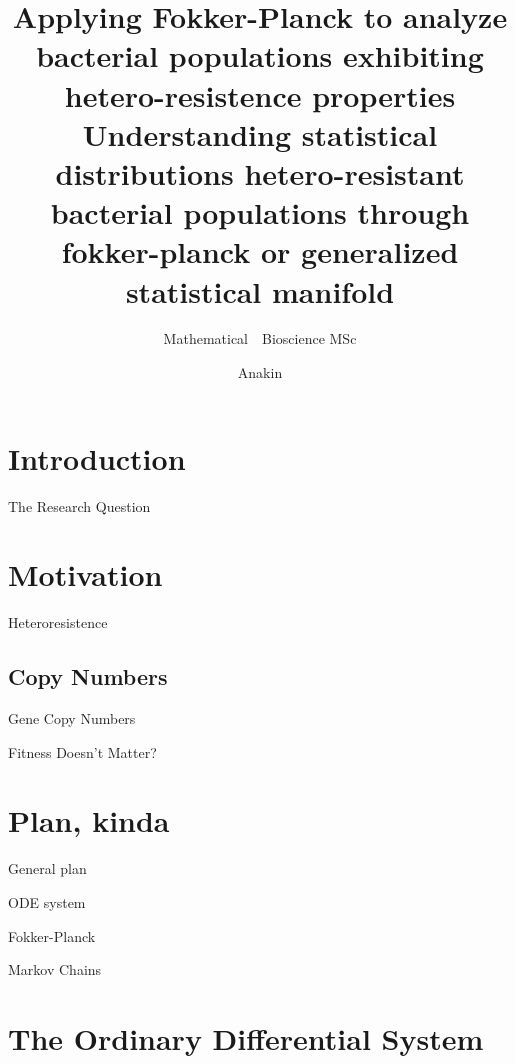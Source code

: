 \documentclass[aspectratio=169]{RUCPresentation}
\title{%
    Applying Fokker-Planck to analyze bacterial populations exhibiting hetero-resistence properties%
}
\title{%
    Understanding statistical distributions hetero-resistant bacterial populations through%
    fokker-planck or generalized statistical manifold%
}
\subtitle{  Mathematical\ \ Bioscience MSc }
\author{Anakin}
\newcommand\makebeamertitle{\frame{\maketitle}}%
\begin{document}
\makebeamertitle


\section{Introduction}

\begin{frame}{The Research Question}
\end{frame}

\section{Motivation}


\begin{frame}{Heteroresistence}
\end{frame}

\subsection{Copy Numbers}

\begin{frame}{Gene Copy Numbers}
\end{frame}


\begin{frame}{Fitness Doesn't Matter?}
\end{frame}



\section{Plan, kinda}

\begin{frame}{General plan}
\end{frame}

\begin{frame}{ODE system}
\end{frame}


\begin{frame}{Fokker-Planck}

\end{frame}

\begin{frame}{Markov Chains}

\end{frame}

\section{The Ordinary Differential System}
\end{document}
